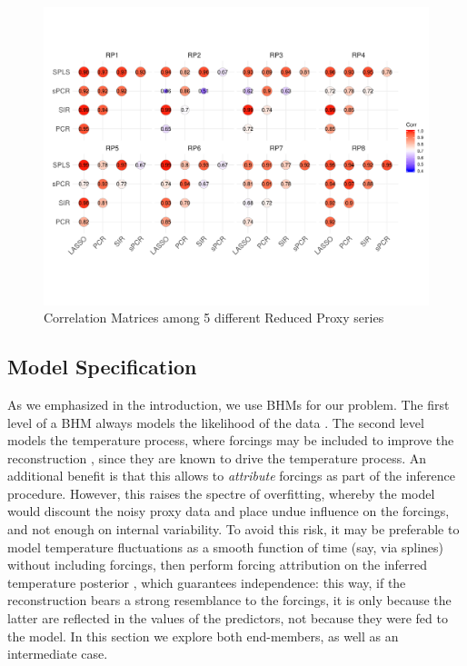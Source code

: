 \documentclass[12pt]{amsart}
\theoremstyle{plain}
\theoremstyle{definition}
\theoremstyle{remark}
\begin{document}
\begin{figure}
  \centering
 \includegraphics[scale=0.35]{CorMatrixRPs} 
  \caption{Correlation Matrices among 5 different Reduced Proxy series}
  \label{fig:CorrRPs}
\end{figure}


\subsection{Model Specification}
\label{sec:modelspec}
As we emphasized in the introduction, we use BHMs for our problem. The first level of a BHM always models the likelihood of the data \citep{Tingley_QSR2012}. The second level models the temperature process, where forcings may be included to improve
the reconstruction \citep{Barboza2014,boli1}, since they are known to drive the
temperature process. An additional benefit is that this allows to {\it
  attribute} forcings \citep[i.e., determine causality,][]{HegerlZwiers:2011} as
part of the inference procedure. However, this raises the spectre of
overfitting, whereby the model would discount the noisy proxy data and place
undue influence on the forcings, and not enough on internal variability. To
avoid this risk, it may be preferable to model temperature fluctuations as a
smooth function of time (say, via splines) without including forcings, then
perform forcing attribution on the inferred temperature posterior
\cite{Schurer2013a, Schurer2013b}, which guarantees independence: this way, if the reconstruction bears a strong resemblance to the forcings, it is only because the latter are reflected in the values of the predictors, not because they were fed to the model. In this section we explore both end-members, as well as an intermediate case. 
\end{document}
